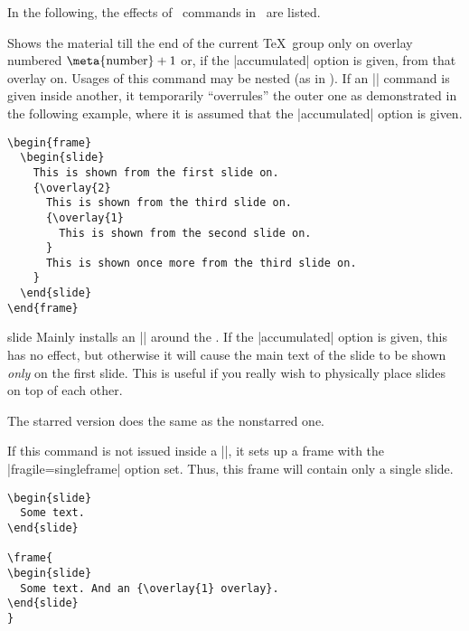 In the following, the effects of \seminar\ commands in \beamer\ are listed.

\begin{command}{\overlay{}}
  Shows the material till the end of the current \TeX\ group only on overlay numbered $\hbox{\meta{number}}+1$ or, if the |accumulated| option is given, from that overlay on. Usages of this command may be nested (as in \seminar). If an |\overlay| command is given inside another, it temporarily ``overrules'' the outer one as demonstrated in the following example, where it is assumed that the |accumulated| option is given.

  \example
\begin{verbatim}
\begin{frame}
  \begin{slide}
    This is shown from the first slide on.
    {\overlay{2}
      This is shown from the third slide on.
      {\overlay{1}
        This is shown from the second slide on.
      }
      This is shown once more from the third slide on.
    }
  \end{slide}
\end{frame}
\end{verbatim}
\end{command}

\begin{environment}{{slide}\opt{|*|}}
  Mainly installs an || around the . If the |accumulated| option is given, this has no effect, but otherwise it will cause the main text of the slide to be shown \emph{only} on the first slide. This is useful if you really wish to physically place slides on top of each other.

  The starred version does the same as the nonstarred one.

  If this command is not issued inside a |\frame|, it sets up a frame with the |fragile=singleframe| option set. Thus, this frame will contain only a single slide.

  \example
\begin{verbatim}
\begin{slide}
  Some text.
\end{slide}

\frame{
\begin{slide}
  Some text. And an {\overlay{1} overlay}.
\end{slide}
}
\end{verbatim}
\end{environment}

